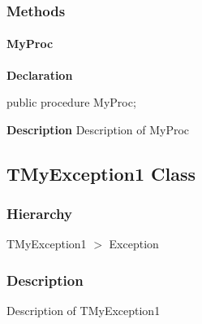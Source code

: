 \documentclass{report}
\newif\ifpdf
\begin{document}
\subsubsection*{\large{\textbf{Methods}}\normalsize\hspace{1ex}\hfill}
\paragraph*{MyProc}\hspace*{\fill}

\label{ok_back_comment.TMyClass-MyProc}
\begin{list}{}{
\setlength{\itemindent}{0cm}
\setlength{\listparindent}{0cm}
\setlength{\leftmargin}{\evensidemargin}
\addtolength{\leftmargin}{\tmplength}
\settowidth{\labelsep}{X}
\addtolength{\leftmargin}{\labelsep}
\setlength{\labelwidth}{\tmplength}
}
\item[\textbf{Declaration}\hfill]
\ifpdf
\begin{flushleft}
\fi
\begin{ttfamily}
public procedure MyProc;\end{ttfamily}

\ifpdf
\end{flushleft}
\fi

\par
\item[\textbf{Description}]
Description of MyProc

\end{list}
\ifpdf
\subsection*{\large{\textbf{TMyException1 Class}}\normalsize\hspace{1ex}\hrulefill}
\else
\subsection*{TMyException1 Class}
\fi
\label{ok_back_comment.TMyException1}
\subsubsection*{\large{\textbf{Hierarchy}}\normalsize\hspace{1ex}\hfill}
TMyException1 {$>$} Exception
\subsubsection*{\large{\textbf{Description}}\normalsize\hspace{1ex}\hfill}
Description of TMyException1\ifpdf
\end{document}
